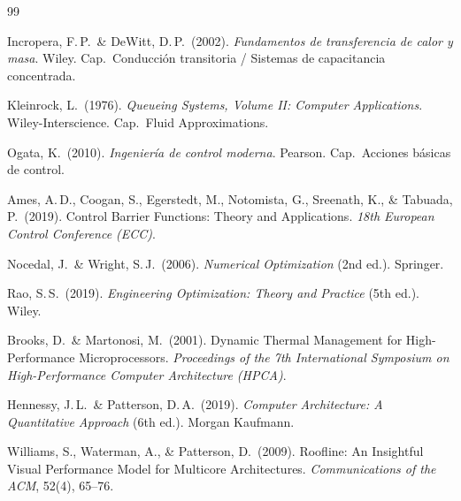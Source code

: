 \documentclass[10pt, twocolumn]{article}
\begin{document}
\begin{thebibliography}{99}

Incropera, F.\,P.\ \& DeWitt, D.\,P.\ (2002).
\emph{Fundamentos de transferencia de calor y masa}.
Wiley. Cap.\ Conducción transitoria / Sistemas de capacitancia concentrada.

Kleinrock, L.\ (1976).
\emph{Queueing Systems, Volume II: Computer Applications}.
Wiley-Interscience. Cap.\ Fluid Approximations.

Ogata, K.\ (2010).
\emph{Ingeniería de control moderna}.
Pearson. Cap.\ Acciones básicas de control.

Ames, A.\,D., Coogan, S., Egerstedt, M., Notomista, G., Sreenath, K.,
\& Tabuada, P.\ (2019).
Control Barrier Functions: Theory and Applications.
\emph{18th European Control Conference (ECC)}.

Nocedal, J.\ \& Wright, S.\,J.\ (2006).
\emph{Numerical Optimization} (2nd ed.).
Springer.

Rao, S.\,S.\ (2019).
\emph{Engineering Optimization: Theory and Practice} (5th ed.).
Wiley.

Brooks, D.\ \& Martonosi, M.\ (2001).
Dynamic Thermal Management for High-Performance Microprocessors.
\emph{Proceedings of the 7th International Symposium on High-Performance
Computer Architecture (HPCA)}.

Hennessy, J.\,L.\ \& Patterson, D.\,A.\ (2019).
\emph{Computer Architecture: A Quantitative Approach} (6th ed.).
Morgan Kaufmann.

Williams, S., Waterman, A., \& Patterson, D.\ (2009).
Roofline: An Insightful Visual Performance Model for Multicore Architectures.
\emph{Communications of the ACM}, 52(4), 65--76.

\end{thebibliography}
\end{document}
